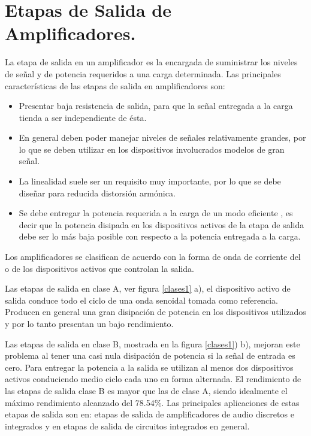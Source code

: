\chapter{Etapas de Salida de Amplificadores. }\label{salida}

\hspace{10pt} La etapa de salida en un amplificador es la encargada de suministrar los niveles  de señal y de potencia requeridos a una carga determinada. Las principales características de las etapas de salida en amplificadores son:

\begin{itemize}
	\item Presentar baja resistencia de salida, para que la señal entregada a la carga tienda a ser independiente de ésta.  
	\item En general deben poder manejar niveles de señales relativamente grandes, por lo que se deben utilizar en los dispositivos involucrados modelos de gran señal.
	\item La linealidad suele ser un requisito muy importante, por lo que se debe diseñar para reducida distorsión armónica.
	\item Se debe entregar la potencia requerida a la carga de un modo eficiente , es decir que la potencia disipada en los dispositivos activos de la etapa de salida debe ser lo más baja posible con respecto a la potencia entregada a la carga.
\end{itemize}

 Los amplificadores se clasifican de acuerdo con la forma de onda de corriente del o de los dispositivos activos que controlan la salida.

Las etapas de salida en clase A, ver figura \ref{clases1} a), el dispositivo activo de salida conduce todo el ciclo de una onda senoidal tomada como referencia. Producen en general una gran disipación de potencia en los dispositivos utilizados y por lo tanto presentan un bajo rendimiento.

Las etapas de salida en clase B,  mostrada en la figura \ref{clases1}) b), mejoran este problema al tener una casi nula disipación de potencia si la señal de entrada es cero. Para entregar la potencia a la salida se utilizan al menos dos dispositivos activos conduciendo medio ciclo cada uno en forma alternada. El rendimiento de las etapas de salida clase B es mayor que las de clase A, siendo idealmente el máximo rendimiento alcanzado del 78.54\%. Las principales aplicaciones de estas etapas de salida son en: etapas de salida de amplificadores de audio discretos e integrados y en etapas de salida de circuitos integrados en general.

